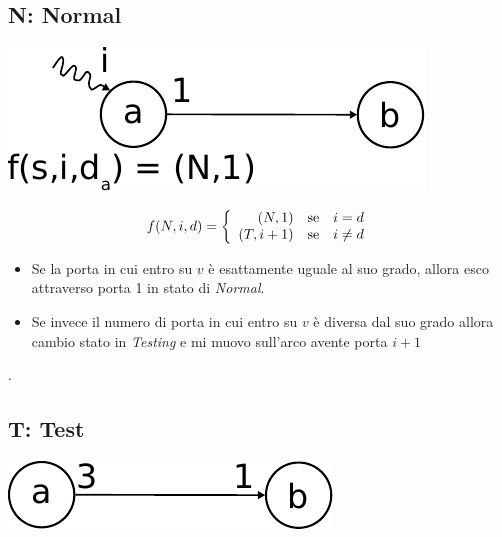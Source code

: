 \subsection{N: Normal}
\begin{center}
    \includegraphics[scale=0.7]{capitoli/esplorazione-grafo-anonimo/imgs/n_27}
\end{center}
\begin{equation}
    f(N,i,d) =
    \left\{
    \begin{array}{r
            @{\quad{\mbox{se}}\quad}
            l}
        (N,1)   & i = d    \\
        (T,i+1) & i \neq d \\
    \end{array}
    \right.
\end{equation}

\begin{itemize}
    \item Se la porta in cui entro su $v$ è esattamente uguale al suo grado,
          allora esco attraverso porta 1 in stato di \textit{Normal}.
    \item Se invece il numero di porta in cui entro su $v$ è diversa dal suo
          grado allora cambio stato in \textit{Testing} e mi muovo sull'arco
          avente porta $i+1$ \end{itemize}.


\subsection{T: Test}
\begin{center}
    \includegraphics[scale=0.7]{capitoli/esplorazione-grafo-anonimo/imgs/n_28}
\end{center}

